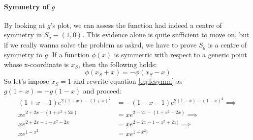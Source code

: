\paragraph[Problem 4]{Symmetry of $g$}
\label{par:subp4_1}
By looking at $g$'s plot, we can assess the function had indeed a centre of symmetry
in $S_g \equiv (1,0)$. This evidence alone is quite sufficient to move on, but if we really wanna
solve the problem as asked, we have to prove $S_g$ is a centre of symmetry to $g$.
If a function $\phi(x)$
is symmetric with respect to a generic point whose x-coordinate is $x_S$, then the
following holds:
\begin{equation}\label{eq:fcsymm}
    \phi(x_S + x) = - \phi(x_S - x)
\end{equation}
So let's impose $x_S = 1$ and rewrite
equation \ref{eq:fcsymm} as $g(1 + x) = - g(1 - x)$ and proceed:
\begin{equation*}
    \begin{split}
        (1 + x - 1)e^{2(1 + x) - (1 + x)^2} &= - (1 - x - 1)e^{2(1 - x) - (1 - x)^2} \implies\\
        xe^{2 + 2x - (1 + x^2 + 2x)} &= xe^{2 - 2x - (1 + x^2 - 2x)} \implies\\
        xe^{2 + 2x - 1 - x^2 - 2x} &= xe^{2 - 2x - 1 - x^2 + 2x)} \implies\\
        xe^{1 - x^2} &= xe^{1 - x^2)}
    \end{split}
\end{equation*}

